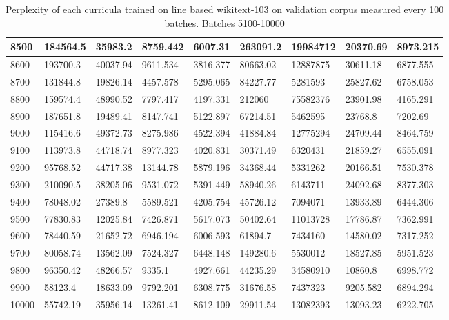 \documentclass [11pt, proquest] {uwthesis}[2020/12/20]
\begin{document}
\begin{table}
\begin{tiny}
\begin{tabular}{|l|l|l|l|l|l|l|l|l|}
8500 & 184564.5 & 35983.2 & 8759.442 & 6007.31 & 263091.2 & 19984712 & 20370.69 & 8973.215 \\\hline
8600 & 193700.3 & 40037.94 & 9611.534 & 3816.377 & 80663.02 & 12887875 & 30611.18 & 6877.555 \\\hline
8700 & 131844.8 & 19826.14 & 4457.578 & 5295.065 & 84227.77 & 5281593 & 25827.62 & 6758.053 \\\hline
8800 & 159574.4 & 48990.52 & 7797.417 & 4197.331 & 212060 & 75582376 & 23901.98 & 4165.291 \\\hline
8900 & 187651.8 & 19489.41 & 8147.741 & 5122.897 & 67214.51 & 5462595 & 23768.8 & 7202.69 \\\hline
9000 & 115416.6 & 49372.73 & 8275.986 & 4522.394 & 41884.84 & 12775294 & 24709.44 & 8464.759 \\\hline
9100 & 113973.8 & 44718.74 & 8977.323 & 4020.831 & 30371.49 & 6320431 & 21859.27 & 6555.091 \\\hline
9200 & 95768.52 & 44717.38 & 13144.78 & 5879.196 & 34368.44 & 5331262 & 20166.51 & 7530.378 \\\hline
9300 & 210090.5 & 38205.06 & 9531.072 & 5391.449 & 58940.26 & 6143711 & 24092.68 & 8377.303 \\\hline
9400 & 78048.02 & 27389.8 & 5589.521 & 4205.754 & 45726.12 & 7094071 & 13933.89 & 6444.306 \\\hline
9500 & 77830.83 & 12025.84 & 7426.871 & 5617.073 & 50402.64 & 11013728 & 17786.87 & 7362.991 \\\hline
9600 & 78440.59 & 21652.72 & 6946.194 & 6006.593 & 61894.7 & 7434160 & 14580.02 & 7317.252 \\\hline
9700 & 80058.74 & 13562.09 & 7524.327 & 6448.148 & 149280.6 & 5530012 & 18527.85 & 5951.523 \\\hline
9800 & 96350.42 & 48266.57 & 9335.1 & 4927.661 & 44235.29 & 34580910 & 10860.8 & 6998.772 \\\hline
9900 & 58123.4 & 18633.09 & 9792.201 & 6308.775 & 31676.58 & 7437323 & 9205.582 & 6894.294 \\\hline
10000 & 55742.19 & 35956.14 & 13261.41 & 8612.109 & 29911.54 & 13082393 & 13093.23 & 6222.705 \\\hline
\end{tabular}
\end{tiny}
\caption{Perplexity of each curricula trained on line based wikitext-103 on validation corpus measured every 100 batches. Batches 5100-10000}
\label{tab:wikitext-103-line-2}
\end{table}
\end{document}
